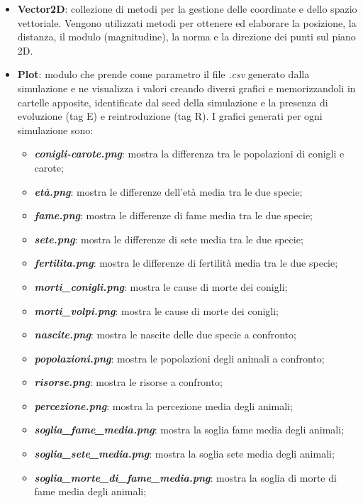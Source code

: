 \documentclass[11pt]{article}
\begin{document}
\begin{itemize}
    \item \textbf{Vector2D}: collezione di metodi per la gestione delle coordinate e dello spazio vettoriale. Vengono utilizzati metodi per ottenere ed elaborare la posizione, la distanza, il modulo (magnitudine), la norma e la direzione dei punti sul piano 2D.
    
    \item \textbf{Plot}: modulo che prende come parametro il file \textit{.csv} generato dalla simulazione e ne visualizza i valori creando diversi grafici e memorizzandoli in cartelle apposite, identificate dal seed della simulazione e la presenza di evoluzione (tag E) e reintroduzione (tag R). I grafici generati per ogni simulazione sono:
    \begin{itemize}
        \item \textbf{\textit{conigli-carote.png}}: mostra la differenza tra le popolazioni di conigli e carote;
        \item \textbf{\textit{età.png}}: mostra le differenze dell'età media tra le due specie;
        \item \textbf{\textit{fame.png}}: mostra le differenze di fame media tra le due specie;
        \item \textbf{\textit{sete.png}}: mostra le differenze di sete media tra le due specie;
        \item \textbf{\textit{fertilita.png}}: mostra le differenze di fertilità media tra le due specie;
        \item \textbf{\textit{morti\_conigli.png}}: mostra le cause di morte dei conigli;
        \item \textbf{\textit{morti\_volpi.png}}: mostra le cause di morte dei conigli;
        \item \textbf{\textit{nascite.png}}: mostra le nascite delle due specie a confronto;
        \item \textbf{\textit{popolazioni.png}}: mostra le popolazioni degli animali a confronto;
        \item \textbf{\textit{risorse.png}}: mostra le risorse a confronto;
        \item \textbf{\textit{percezione.png}}: mostra la percezione media degli animali;
        \item \textbf{\textit{soglia\_fame\_media.png}}: mostra la soglia fame media degli animali;
        \item \textbf{\textit{soglia\_sete\_media.png}}: mostra la soglia sete media degli animali;
        \item \textbf{\textit{soglia\_morte\_di\_fame\_media.png}}: mostra la soglia di morte di fame media degli animali;

\end{itemize}
\end{itemize}
\end{document}
